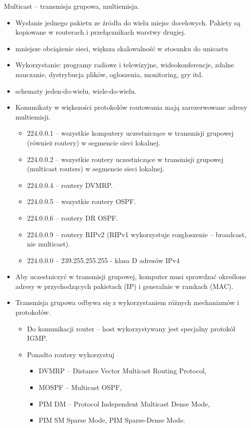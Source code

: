\documentclass[../main.tex]{subfiles}
\begin{document}
    Multicast – transmisja grupowa, multiemisja.
    \begin{itemize}
        \item Wysłanie jednego pakietu ze źródła do wielu miejsc docelowych. Pakiety są kopiowane
        w routerach i przełącznikach warstwy drugiej.
        \item mniejsze obciążenie
        sieci, większa skalowalność w stosunku do unicastu
        \item Wykorzystanie: programy radiowe i telewizyjne, wideokonferencje, zdalne nauczanie,
        dystrybucja plików, ogłoszenia, monitoring, gry itd.
        \item schematy jeden-do-wielu, wiele-do-wielu.
        \item Komunikaty w większości protokołów routowania mają zarezerwowane adresy multiemisji.
        \begin{itemize}
            \item 224.0.0.1 – wszystkie komputery uczestniczące w transmisji grupowej (również routery) w
            segmencie sieci lokalnej.
            \item 224.0.0.2 – wszystkie routery uczestniczące w transmisji grupowej (multicast routers) w
            segmencie sieci lokalnej.
            \item 224.0.0.4 – routery DVMRP.
            \item 224.0.0.5 – wszystkie routery OSPF.
            \item 224.0.0.6 – routery DR OSPF.
            \item 224.0.0.9 – routery RIPv2 (RIPv1 wykorzystuje rozgłoszenie – broadcast, nie multicast).
            \item 224.0.0.0 – 239.255.255.255 - klasa D adresów IPv4
        \end{itemize}
        \item Aby uczestniczyć w transmisji grupowej, komputer musi sprawdzać określone adresy w
        przychodzących pakietach (IP) i generalnie w ramkach (MAC).
        \item Transmisja grupowa odbywa się z wykorzystaniem różnych mechanizmów i protokołów.
        \begin{itemize}
            \item Do komunikacji router – host wykorzystywany jest specjalny protokół IGMP.
            \item Ponadto routery wykorzystuj
            \begin{itemize}
                \item DVMRP – Distance Vector Multicast Routing Protocol,
                \item MOSPF – Multicast OSPF,
                \item PIM DM – Protocol Independent Multicast Dense Mode,
                \item PIM SM Sparse Mode, PIM Sparse-Dense Mode.
            \end{itemize}
        \end{itemize}
    \end{itemize}
\end{document}
